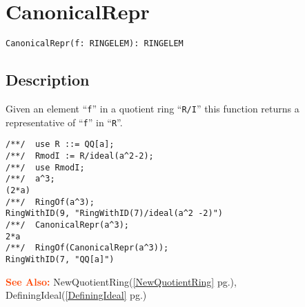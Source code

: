 \documentclass[a4paper]{mybook}
\newenvironment{command}{}{} %
\newcommand\SeeAlso{\par\textcolor{OrangeRed}{\textbf{\large See Also: }}}
\begin{document}
\section{CanonicalRepr}
\label{CanonicalRepr}
\begin{command} %


\begin{Verbatim}[label=syntax, rulecolor=\color{MidnightBlue},
frame=single]
CanonicalRepr(f: RINGELEM): RINGELEM
\end{Verbatim}


\subsection*{Description}

Given an element ``\verb&f&'' in a quotient ring ``\verb&R/I&'' this function
returns a representative of ``\verb&f&'' in ``\verb&R&''.
\begin{Verbatim}[label=example, rulecolor=\color{PineGreen}, frame=single]
/**/  use R ::= QQ[a];
/**/  RmodI := R/ideal(a^2-2);
/**/  use RmodI;
/**/  a^3;
(2*a)
/**/  RingOf(a^3);
RingWithID(9, "RingWithID(7)/ideal(a^2 -2)")
/**/  CanonicalRepr(a^3);
2*a
/**/  RingOf(CanonicalRepr(a^3));
RingWithID(7, "QQ[a]")
\end{Verbatim}


\SeeAlso %
  NewQuotientRing(\ref{NewQuotientRing} pg.\pageref{NewQuotientRing}), 
    DefiningIdeal(\ref{DefiningIdeal} pg.\pageref{DefiningIdeal})
\end{command} %
\end{document}
